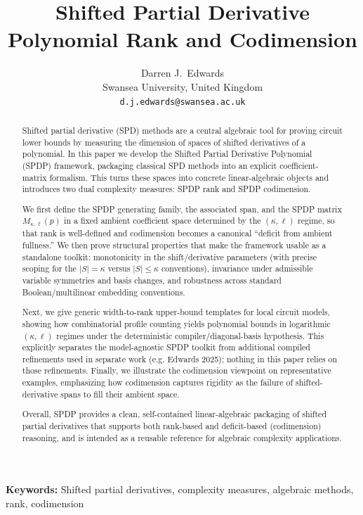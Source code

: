 \documentclass[12pt]{article}
\title{Shifted Partial Derivative Polynomial Rank and Codimension}
\author{Darren J.\ Edwards\\
\small Swansea University, United Kingdom\\
\small \texttt{d.j.edwards@swansea.ac.uk}}
\date{}
\theoremstyle{definition}
\theoremstyle{remark}
\begin{document}
\maketitle

\begin{abstract}
Shifted partial derivative (SPD) methods are a central algebraic tool for proving
circuit lower bounds by measuring the dimension of spaces of shifted derivatives
of a polynomial. In this paper we develop the Shifted Partial Derivative Polynomial
(SPDP) framework, packaging classical SPD methods into an explicit
coefficient-matrix formalism. This turns these spaces into concrete
linear-algebraic objects and introduces two dual complexity measures:
SPDP rank and SPDP codimension.

We first define the SPDP generating family, the associated span, and the SPDP
matrix $M_{\kappa,\ell}(p)$ in a fixed ambient coefficient space determined by the
$(\kappa,\ell)$ regime, so that rank is well-defined and codimension becomes a
canonical ``deficit from ambient fullness.'' We then prove structural properties
that make the framework usable as a standalone toolkit: monotonicity in the
shift/derivative parameters (with precise scoping for the $|S|=\kappa$ versus
$|S|\le \kappa$ conventions), invariance under admissible variable symmetries and
basis changes, and robustness across standard Boolean/multilinear embedding
conventions.

Next, we give generic width-to-rank upper-bound templates for local circuit
models, showing how combinatorial profile counting yields polynomial bounds
in logarithmic $(\kappa,\ell)$ regimes under the deterministic compiler/diagonal-basis
hypothesis. This explicitly separates the model-agnostic SPDP toolkit from
additional compiled refinements used in separate work (e.g. Edwards 2025);
nothing in this paper relies on those refinements. Finally, we illustrate the
codimension viewpoint on representative examples, emphasizing how codimension
captures rigidity as the failure of shifted-derivative spans to fill their
ambient space.

Overall, SPDP provides a clean, self-contained linear-algebraic packaging of
shifted partial derivatives that supports both rank-based and deficit-based
(codimension) reasoning, and is intended as a reusable reference for algebraic
complexity applications.
\end{abstract}

\noindent\textbf{Keywords:} Shifted partial derivatives, complexity measures, algebraic methods, rank, codimension
\end{document}
